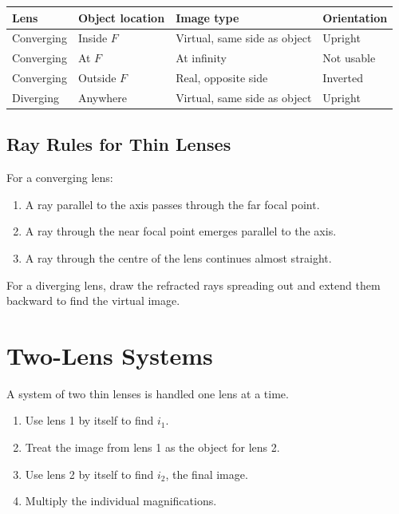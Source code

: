 \documentclass{studentnotes}
\begin{document}
\begin{center}
\renewcommand{\arraystretch}{1.35}
\begin{tabular}{>{\raggedright\arraybackslash}p{3.0cm}
                >{\raggedright\arraybackslash}p{3.0cm}
                >{\raggedright\arraybackslash}p{3.5cm}
                >{\raggedright\arraybackslash}p{3.2cm}}
\toprule
\textbf{Lens} & \textbf{Object location} & \textbf{Image type} & \textbf{Orientation} \\
\midrule
Converging & Inside \(F\) & Virtual, same side as object & Upright \\
Converging & At \(F\) & At infinity & Not usable \\
Converging & Outside \(F\) & Real, opposite side & Inverted \\
Diverging & Anywhere & Virtual, same side as object & Upright \\
\bottomrule
\end{tabular}
\end{center}

\subsection{Ray Rules for Thin Lenses}

For a converging lens:

\begin{enumerate}
    \item A ray parallel to the axis passes through the far focal point.
    \item A ray through the near focal point emerges parallel to the axis.
    \item A ray through the centre of the lens continues almost straight.
\end{enumerate}

For a diverging lens, draw the refracted rays spreading out and extend them
backward to find the virtual image.

\section{Two-Lens Systems}

A system of two thin lenses is handled one lens at a time.

\begin{enumerate}
    \item Use lens 1 by itself to find \(i_1\).
    \item Treat the image from lens 1 as the object for lens 2.
    \item Use lens 2 by itself to find \(i_2\), the final image.
    \item Multiply the individual magnifications.
\end{enumerate}
\end{document}
